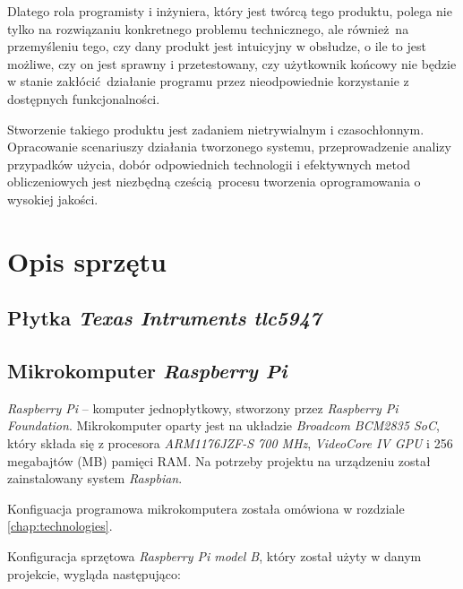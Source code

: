 \documentclass[eng,printmode]{mgr}
\begin{document}
Dlatego rola programisty i inżyniera, który jest twórcą tego produktu, polega nie tylko na rozwiązaniu konkretnego problemu technicznego, ale również na przemyśleniu tego, czy dany produkt jest intuicyjny w obsłudze, o ile to jest możliwe, czy on jest sprawny i przetestowany, czy użytkownik końcowy nie będzie w stanie zakłócić działanie programu przez nieodpowiednie korzystanie z dostępnych funkcjonalności.

Stworzenie takiego produktu jest zadaniem nietrywialnym i czasochłonnym. Opracowanie scenariuszy działania tworzonego systemu, przeprowadzenie analizy przypadków użycia, dobór odpowiednich technologii i efektywnych metod obliczeniowych jest niezbędną cześcią procesu tworzenia oprogramowania o wysokiej jakości.


\chapter{Opis sprzętu}

\section{Płytka \emph{Texas Intruments tlc5947}}

\section{Mikrokomputer \emph{Raspberry Pi}}
\emph{Raspberry Pi} -- komputer jednopłytkowy, stworzony przez \emph{Raspberry Pi Foundation}. Mikrokomputer oparty jest na układzie \emph{Broadcom BCM2835 SoC}, który składa się z procesora \emph{ARM1176JZF-S 700 MHz}, \emph{VideoCore IV GPU} i 256 megabajtów (MB) pamięci RAM. Na potrzeby projektu na urządzeniu został zainstalowany system \emph{Raspbian}. 

Konfiguacja programowa mikrokomputera została omówiona w rozdziale \ref{chap:technologies}.

Konfiguracja sprzętowa \emph{Raspberry Pi model B}, który został użyty w danym projekcie, wygląda następująco:
\end{document}
